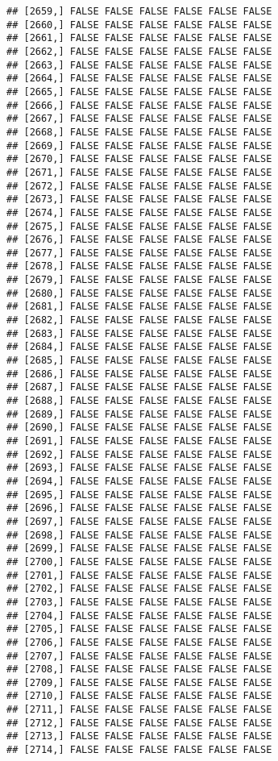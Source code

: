 \documentclass[
]{article}
\begin{document}
\begin{verbatim}
## [2659,] FALSE FALSE FALSE FALSE FALSE FALSE
## [2660,] FALSE FALSE FALSE FALSE FALSE FALSE
## [2661,] FALSE FALSE FALSE FALSE FALSE FALSE
## [2662,] FALSE FALSE FALSE FALSE FALSE FALSE
## [2663,] FALSE FALSE FALSE FALSE FALSE FALSE
## [2664,] FALSE FALSE FALSE FALSE FALSE FALSE
## [2665,] FALSE FALSE FALSE FALSE FALSE FALSE
## [2666,] FALSE FALSE FALSE FALSE FALSE FALSE
## [2667,] FALSE FALSE FALSE FALSE FALSE FALSE
## [2668,] FALSE FALSE FALSE FALSE FALSE FALSE
## [2669,] FALSE FALSE FALSE FALSE FALSE FALSE
## [2670,] FALSE FALSE FALSE FALSE FALSE FALSE
## [2671,] FALSE FALSE FALSE FALSE FALSE FALSE
## [2672,] FALSE FALSE FALSE FALSE FALSE FALSE
## [2673,] FALSE FALSE FALSE FALSE FALSE FALSE
## [2674,] FALSE FALSE FALSE FALSE FALSE FALSE
## [2675,] FALSE FALSE FALSE FALSE FALSE FALSE
## [2676,] FALSE FALSE FALSE FALSE FALSE FALSE
## [2677,] FALSE FALSE FALSE FALSE FALSE FALSE
## [2678,] FALSE FALSE FALSE FALSE FALSE FALSE
## [2679,] FALSE FALSE FALSE FALSE FALSE FALSE
## [2680,] FALSE FALSE FALSE FALSE FALSE FALSE
## [2681,] FALSE FALSE FALSE FALSE FALSE FALSE
## [2682,] FALSE FALSE FALSE FALSE FALSE FALSE
## [2683,] FALSE FALSE FALSE FALSE FALSE FALSE
## [2684,] FALSE FALSE FALSE FALSE FALSE FALSE
## [2685,] FALSE FALSE FALSE FALSE FALSE FALSE
## [2686,] FALSE FALSE FALSE FALSE FALSE FALSE
## [2687,] FALSE FALSE FALSE FALSE FALSE FALSE
## [2688,] FALSE FALSE FALSE FALSE FALSE FALSE
## [2689,] FALSE FALSE FALSE FALSE FALSE FALSE
## [2690,] FALSE FALSE FALSE FALSE FALSE FALSE
## [2691,] FALSE FALSE FALSE FALSE FALSE FALSE
## [2692,] FALSE FALSE FALSE FALSE FALSE FALSE
## [2693,] FALSE FALSE FALSE FALSE FALSE FALSE
## [2694,] FALSE FALSE FALSE FALSE FALSE FALSE
## [2695,] FALSE FALSE FALSE FALSE FALSE FALSE
## [2696,] FALSE FALSE FALSE FALSE FALSE FALSE
## [2697,] FALSE FALSE FALSE FALSE FALSE FALSE
## [2698,] FALSE FALSE FALSE FALSE FALSE FALSE
## [2699,] FALSE FALSE FALSE FALSE FALSE FALSE
## [2700,] FALSE FALSE FALSE FALSE FALSE FALSE
## [2701,] FALSE FALSE FALSE FALSE FALSE FALSE
## [2702,] FALSE FALSE FALSE FALSE FALSE FALSE
## [2703,] FALSE FALSE FALSE FALSE FALSE FALSE
## [2704,] FALSE FALSE FALSE FALSE FALSE FALSE
## [2705,] FALSE FALSE FALSE FALSE FALSE FALSE
## [2706,] FALSE FALSE FALSE FALSE FALSE FALSE
## [2707,] FALSE FALSE FALSE FALSE FALSE FALSE
## [2708,] FALSE FALSE FALSE FALSE FALSE FALSE
## [2709,] FALSE FALSE FALSE FALSE FALSE FALSE
## [2710,] FALSE FALSE FALSE FALSE FALSE FALSE
## [2711,] FALSE FALSE FALSE FALSE FALSE FALSE
## [2712,] FALSE FALSE FALSE FALSE FALSE FALSE
## [2713,] FALSE FALSE FALSE FALSE FALSE FALSE
## [2714,] FALSE FALSE FALSE FALSE FALSE FALSE

\end{verbatim}
\end{document}
